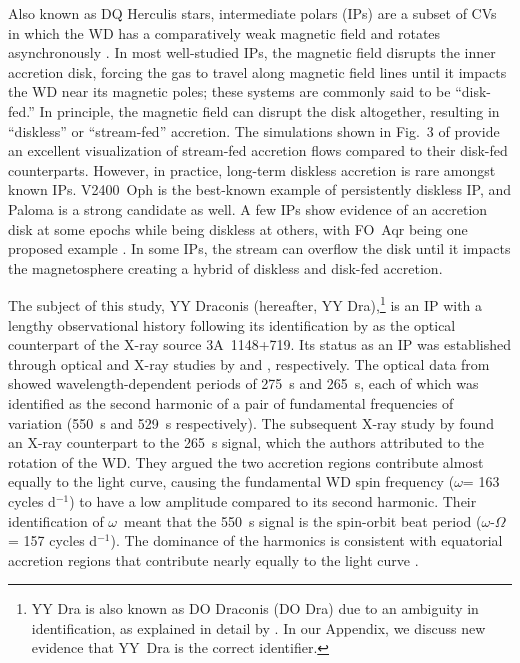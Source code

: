 \documentclass[twocolumn]{aastex63}
\newcommand{\spin}{$\omega$}
\newcommand{\beat}{$\omega$-$\Omega$}
\begin{document}
Also known as DQ Herculis stars, intermediate polars (IPs) are a subset of CVs in which the WD has a comparatively weak magnetic field and rotates asynchronously \citep[for a review, see][]{Patterson94}. In most well-studied IPs, the magnetic field disrupts the inner accretion disk, forcing the gas to travel along magnetic field lines until it impacts the WD near its magnetic poles; these systems are commonly said to be ``disk-fed.'' In principle, the magnetic field can disrupt the disk altogether, resulting in ``diskless'' or ``stream-fed'' accretion. The simulations shown in Fig.~3 of \citet{norton04} provide an excellent visualization of stream-fed accretion flows compared to their disk-fed counterparts. However, in practice, long-term diskless accretion is rare amongst known IPs. V2400~Oph \citep{buckley95, buckley97} is the best-known example of persistently diskless IP, and Paloma \citep{schwarz, joshi} is a strong candidate as well. A few IPs show evidence of an accretion disk at some epochs while being diskless at others, with FO~Aqr being one proposed example \citep{Littlefield20}. In some IPs, the stream can overflow the disk until it impacts the magnetosphere creating a hybrid of diskless and disk-fed accretion.

The subject of this study, YY Draconis (hereafter, YY Dra),\footnote{YY Dra is also known as DO Draconis (DO Dra) due to an ambiguity in identification, as explained in detail by \citet{patterson87}. In our Appendix, we discuss new evidence that YY~Dra is the correct identifier.} is an IP with a lengthy observational history following its identification by \citet{patterson82} as the optical counterpart of the X-ray source 3A\ 1148+719. Its status as an IP was established through optical and X-ray studies by \citet{Patterson92} and \citet{patterson93}, respectively. The optical data from \citet{Patterson92} showed wavelength-dependent periods of 275~s and 265~s, each of which was identified as the second harmonic of a pair of fundamental frequencies of variation (550~s and 529~s respectively). The subsequent X-ray study by \citet{patterson93} found an X-ray counterpart to the 265~s signal, which the authors attributed to the rotation of the WD. They argued the two accretion regions contribute almost equally to the light curve, causing the fundamental WD spin frequency (\spin = 163 cycles d$^{-1}$) to have a low amplitude compared to its second harmonic. Their identification of \spin\ meant that the 550~s signal is the spin-orbit beat period (\beat = 157 cycles d$^{-1}$). The dominance of the harmonics is consistent with equatorial accretion regions that contribute nearly equally to the light curve \citep{szkody02}. 
\end{document}
